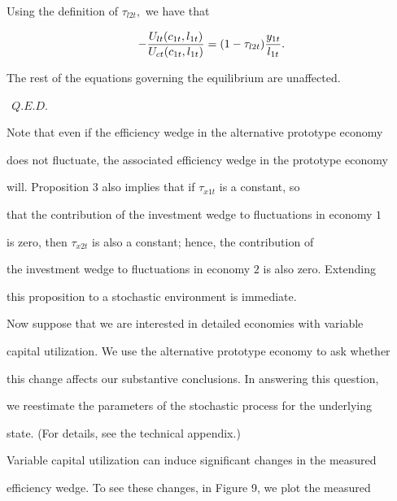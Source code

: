 \documentclass[fleqn,leqno,11pt]{article}
\begin{document}
Using the definition of $\tau _{l2t},$ we have that 

\[

-\frac{U_{lt}(c_{1t},l_{1t})}{U_{ct}(c_{1t},l_{1t})}=(1-\tau _{l2t})\frac{%

y_{1t}}{l_{1t}}. 

\]%

The rest of the equations governing the equilibrium are unaffected. 



\hspace{1.75in}


$\ \ Q.E.D.$



\bigskip



Note that even if the efficiency wedge in the alternative prototype economy

does not fluctuate, the associated efficiency wedge in the prototype economy

will. Proposition 3 also implies that if $\tau _{x1t}$ is a constant, so

that the contribution of the investment wedge to fluctuations in economy $1$

is zero, then $\tau _{x2t}$ is also a constant; hence, the contribution of

the investment wedge to fluctuations in economy $2$ is also zero. Extending

this proposition to a stochastic environment is immediate.



Now suppose that we are interested in detailed economies with variable

capital utilization. We use the alternative prototype economy to ask whether

this change affects our substantive conclusions. In answering this question,

we reestimate the parameters of the stochastic process for the underlying

state. (For details, see the technical appendix.)\ 



Variable capital utilization can induce significant changes in the measured

efficiency wedge. To see these changes, in Figure 9, we plot the measured
\end{document}
